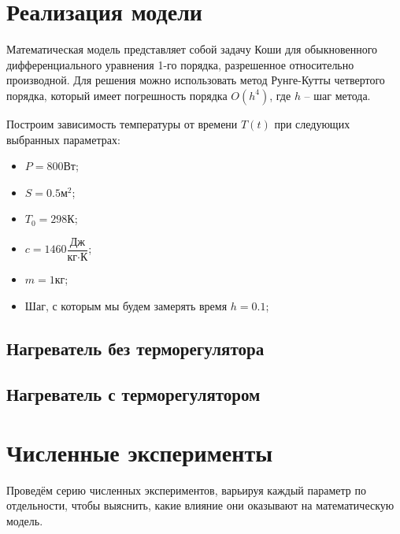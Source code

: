 \pagebreak

\section{Реализация модели}
	Математическая модель представляет собой задачу Коши для обыкновенного дифференциального уравнения 1-го порядка, разрешенное относительно производной. Для решения можно использовать метод Рунге-Кутты четвертого порядка, который имеет погрешность порядка \(O(h^4)\), где \( h \) -- шаг метода.

	Построим зависимость температуры от времени $T(t)$ при следующих выбранных параметрах:
	\begin{itemize}
		\item $P = 800\text{Вт}$;
		\item $S = 0.5 \text{м}^2$;
		\item $T_0 = 298 \text{К}$;
		\item $c = 1460 \dfrac{\text{Дж}}{\text{кг} \cdot \text{К}}$;
		\item $m = 1 \text{кг}$;
		\item Шаг, с которым мы будем замерять время $h = 0.1$;
	\end{itemize}

	\subsection{Нагреватель без терморегулятора}

		

	\subsection{Нагреватель с терморегулятором}

		


\section{Численные эксперименты}
	Проведём серию численных экспериментов, варьируя каждый параметр по отдельности, чтобы выяснить, какие влияние они оказывают на математическую модель.


